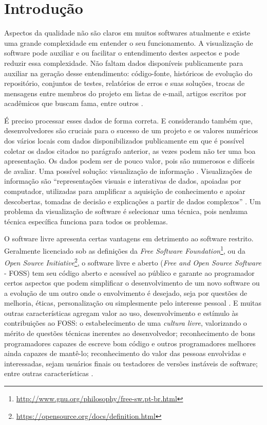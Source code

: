 \chapter{Introdução}


Aspectos da qualidade não são claros em muitos softwares atualmente e existe
uma grande complexidade em entender o seu funcionamento. A visualização de
software pode auxiliar e ou facilitar o entendimento destes aspectos e pode
reduzir essa complexidade. Não faltam dados disponíveis publicamente para
auxiliar na geração desse entendimento: código-fonte, históricos de evolução do
repositório, conjuntos de testes, relatórios de erros e suas soluções, trocas
de mensagens entre membros do projeto em listas de e-mail, artigos escritos por
acadêmicos que buscam fama, entre outros \cite{messias2012}
\cite{benkler2006wealth}.

É preciso processar esses dados de forma correta. E considerando também que,
desenvolvedores são cruciais para o sucesso de um projeto e os valores
numéricos dos vários locais com dados disponibilizados publicamente em que é
possível coletar os dados citados no parágrafo anterior, as vezes podem não ter
uma boa apresentação. Os dados podem ser de pouco valor, pois são numerosos e
difíceis de avaliar. Uma possível solução: visualização de informação
\cite{messias2012}. Visualizações de informação são ``representações visuais e
interativas de dados, apoiadas por computador, utilizadas para amplificar a
aquisição de conhecimento e apoiar descobertas, tomadas de decisão e
explicações a partir de dados complexos'' \cite{card1999readings}. Um problema
da visualização de software é selecionar uma técnica, pois nenhuma técnica
específica funciona para todos os problemas.

O software livre apresenta certas vantagens em detrimento ao software restrito.
Geralmente licenciado sob as definições da
\textit{Free Software Foundation}\footnote{\url{http://www.gnu.org/philosophy/free-sw.pt-br.html}},
ou da \textit{Open Source Initiative}\footnote{\url{https://opensource.org/docs/definition.html}},
o software livre e aberto (\textit{Free and Open Source Software} - FOSS) tem
seu código aberto e acessível ao público e garante ao programador certos
aspectos que podem simplificar o desenvolvimento de um novo software ou a
evolução de um outro onde o envolvimento é desejado, seja por questões de
melhoria, éticas, personalização ou simplesmente pelo interesse pessoal
\cite{meirelles2013monitoramento}. E muitas outras características agregam
valor ao uso, desenvolvimento e estímulo às contribuições ao FOSS: o
estabelecimento de uma \textit{cultura livre}, valorizando o mérito de questões
técnicas inerentes ao desenvolvedor; reconhecimento de bons programadores
capazes de escreve bom código e outros programadores melhores ainda capazes de
mantê-lo; reconhecimento do valor das pessoas envolvidas e interessadas, sejam
usuários finais ou testadores de versões instáveis de software; entre outras
características \cite{raymond1999cathedral}.

